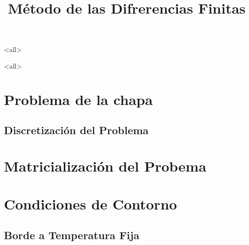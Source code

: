 \mode<all>
\usepackage[spanish]{babel}









\title{
    Método de las Difrerencias Finitas }
\subject{Repaso de Diferencias Finitas, Ayudas para el ejercicio 1 de la guía}



\mode<all>

\section{Problema de la chapa}

\subsection{Discretización del Problema}

\section{Matricialización del Probema}

\section{Condiciones de Contorno}
\subsection{ Borde a Temperatura Fija }

